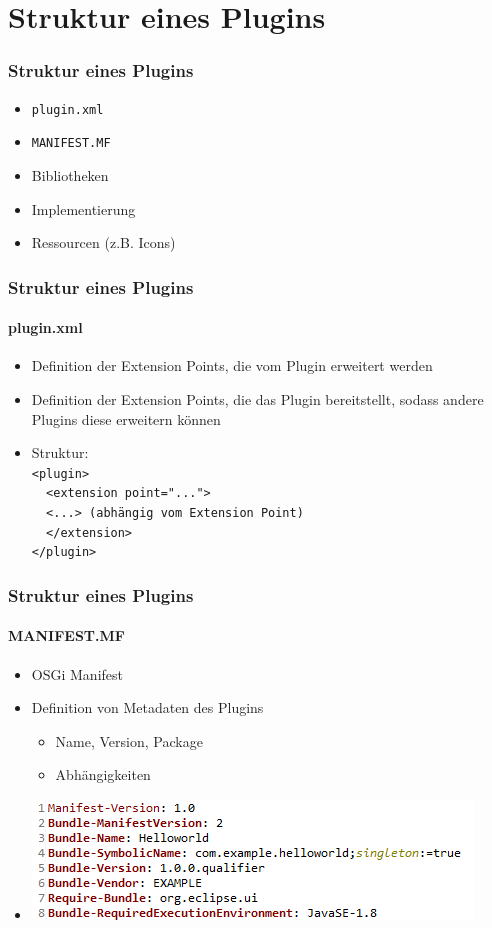 {\section{Struktur eines Plugins}
\begin{frame}
  \frametitle{Struktur eines Plugins}
  \begin{itemize}
  \item \texttt{plugin.xml}
  \item \texttt{MANIFEST.MF}
  \item Bibliotheken
  \item Implementierung
  \item Ressourcen (z.B. Icons)
  \end{itemize}
\end{frame}

\begin{frame}
  \frametitle{Struktur eines Plugins}
  \framesubtitle{plugin.xml}
  \begin{itemize}
  \item Definition der Extension Points, die vom Plugin erweitert werden
  \item Definition der Extension Points, die das Plugin bereitstellt, sodass andere Plugins diese erweitern können
  \item Struktur: \\
  \texttt{<plugin>\\ \ \ <extension point="...">\\ \ \ <...> (abhängig vom Extension Point)\\ \ \ </extension>\\ </plugin>}
  \end{itemize}
\end{frame}

\begin{frame}
  \frametitle{Struktur eines Plugins}
  \framesubtitle{MANIFEST.MF}
  \begin{itemize}
    \item OSGi Manifest
    \item Definition von Metadaten des Plugins
    \begin{itemize}
      \item Name, Version, Package
      \item Abhängigkeiten
    \end{itemize}
    \item \includegraphics[scale=0.8]{images/manifest.png}
  \end{itemize}
\end{frame}

}
